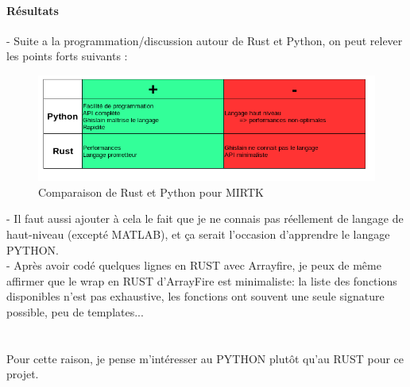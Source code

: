 \documentclass{report}
\begin{document}
\paragraph{Résultats}
- Suite a la programmation/discussion autour de Rust et Python, on peut relever les points forts suivants : 
\begin{figure}[h!]
	\begin{center}
		\includegraphics[width=19cm]{figures/tableau_comparatigf.png}
	\end{center}	
	\caption{Comparaison de Rust et Python pour MIRTK}
	\label{Comparaison de Rust et Python pour MIRTK}
\end{figure}

- Il faut aussi ajouter à cela le fait que je ne connais pas réellement de langage de haut-niveau (excepté MATLAB), et ça serait l'occasion d'apprendre le langage PYTHON.\\

- Après avoir codé quelques lignes en RUST avec Arrayfire, je peux de même affirmer que le wrap en RUST d'ArrayFire est minimaliste: la liste des fonctions disponibles n'est pas exhaustive, les fonctions ont souvent une seule signature possible, peu de templates...\\
\\
\\
Pour cette raison, je pense m'intéresser au PYTHON plutôt qu'au RUST pour ce projet.
\end{document}
